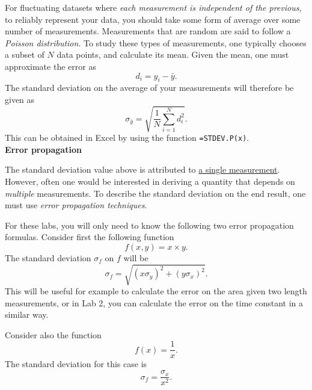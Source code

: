 \documentclass[12pt]{report}
\begin{document}
For fluctuating datasets where \textit{each measurement is independent of the previous}, to reliably represent your data, you should take some form of average over some number of measurements. Measurements that are random are said to follow a \textit{Poisson distribution}. To study these types of measurements, one typically chooses a subset of $N$ data points, and calculate its mean. Given the mean, one must approximate the error as
\begin{equation}
d_i = y_i - \bar{y}.
\end{equation}
The standard deviation on the average of your measurements will therefore be given as
\begin{equation}
\sigma_{\bar{y}} = \sqrt{ \frac{1}{N} \displaystyle \sum_{i=1}^{N} d_i^2}.
\label{Eq:STDev.P}
\end{equation}
This can be obtained in Excel by using the function \verb|=STDEV.P(x)|. \\

\noindent \large \textbf{Error propagation} \normalsize

The standard deviation value above is attributed to \underline{a single measurement}. However, often one would be interested in deriving a quantity that depends on \textit{multiple} measurements. To describe the standard deviation on the end result, one must use \textit{error propagation techniques}.

For these labs, you will only need to know the following two error propagation formulas. Consider first the following function
\begin{equation}
f(x,y) = x \times y.
\label{Eq:f=xy}
\end{equation}
The standard deviation $\sigma_f$ on $f$ will be
\begin{equation}
\sigma_f = \sqrt{ (x \sigma_y)^2 + (y \sigma_x)^2}.
\label{Eq:product error}
\end{equation}
This will be useful for example to calculate the error on the area given two length measurements, or in Lab 2, you can calculate the error on the time constant in a similar way.

Consider also the function
\begin{equation}
f(x) = \frac{1}{x}.
\label{Eq:f=1/x}
\end{equation}
The standard deviation for this case is
\begin{equation}
\sigma_f = \frac{\sigma_x}{x^2}.
\label{Eq:1/x error}
\end{equation}
\end{document}
